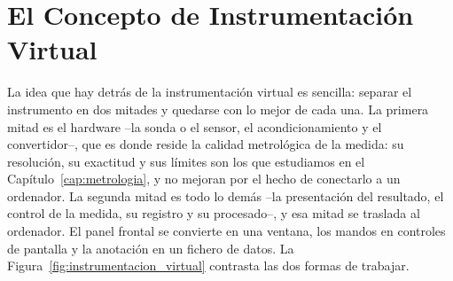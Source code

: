 \section{El Concepto de Instrumentación Virtual}\label{sec:instrumentacion_virtual}

La idea que hay detrás de la instrumentación virtual es sencilla: separar el instrumento en dos mitades y quedarse con lo mejor de cada una. La primera mitad es el hardware --la sonda o el sensor, el acondicionamiento y el convertidor--, que es donde reside la calidad metrológica de la medida: su resolución, su exactitud y sus límites son los que estudiamos en el Capítulo~\ref{cap:metrologia}, y no mejoran por el hecho de conectarlo a un ordenador. La segunda mitad es todo lo demás --la presentación del resultado, el control de la medida, su registro y su procesado--, y esa mitad se traslada al ordenador. El panel frontal se convierte en una ventana, los mandos en controles de pantalla y la anotación en un fichero de datos. La Figura~\ref{fig:instrumentacion_virtual} contrasta las dos formas de trabajar.

